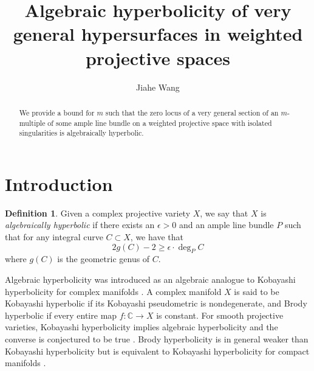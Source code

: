 \documentclass{amsart}
\theoremstyle{definition}
\newtheorem{definition}[theorem]{Definition}
\theoremstyle{remark}
\begin{document}
\pagestyle{plain}
\title{Algebraic hyperbolicity of very general hypersurfaces in weighted projective spaces}

\author[J. Wang]{Jiahe Wang}
\address{UCLA Mathematics Department, Box 951555, Los Angeles, CA 90095-1555, USA
}



\begin{abstract}
We provide a bound for $m$ such that the zero locus of a very general section of an $m$-multiple of
some ample line bundle on a weighted projective space with isolated singularities is algebraically hyperbolic.
\end{abstract}

\maketitle





\section{Introduction}
\begin{definition}
    Given a complex projective variety $X$, we say that $X$ is \emph{algebraically hyperbolic} if there exists an $\epsilon > 0$ and an ample line bundle $P$ such that for any integral curve $C \subset X$, we have that
    \[
    2g(C) - 2 \geq \epsilon \cdot \deg_P C
    \]
    where $g(C)$ is the geometric genus of $C$.
\end{definition}

 Algebraic hyperbolicity was introduced as an algebraic analogue to Kobayashi hyperbolicity for complex manifolds \cite{Demailly1997}. A complex manifold \(X\) is said to be Kobayashi hyperbolic if its Kobayashi pseudometric is nondegenerate, and Brody hyperbolic if every entire map \(f:\mathbb{C}\to X\) is constant. For smooth projective varieties, Kobayashi hyperbolicity implies algebraic hyperbolicity and the converse is conjectured to be true \cite{Demailly1997}. Brody hyperbolicity is in general weaker than Kobayashi hyperbolicity but is equivalent to Kobayashi hyperbolicity for compact manifolds \cite{Brody1978}.
\end{document}
